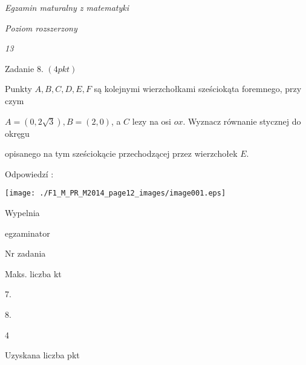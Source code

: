 \documentclass[a4paper,12pt]{article}
\begin{document}
{\it Egzamin maturalny z matematyki}

{\it Poziom rozszerzony}

{\it 13}

Zadanie 8. $(4pkt)$

Punkty $A, B, C, D, E, F$ są kolejnymi wierzchołkami sześciokąta foremnego, przy czym

$A=(0,2\sqrt{3}), B=(2,0)$, a $C$ lezy na osi $ox$. Wyznacz równanie stycznej do okręgu

opisanego na tym sześciokącie przechodzącej przez wierzchołek $E.$

Odpowiedzí :
\begin{center}
\texttt{[image: ./F1\_M\_PR\_M2014\_page12\_images/image001.eps]}
\end{center}
Wypelnia

egzaminator

Nr zadania

Maks. liczba kt

7.

8.

4

Uzyskana liczba pkt
\end{document}
